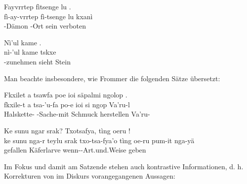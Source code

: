 \begin{interlin}
	\glll Fayvrrtep fìtsenge lu . \\
	fì-ay-vrrtep fì-tsenge lu kxanì \\
	-Dämon -Ort sein verboten \\
\end{interlin}

\begin{interlin}
	\glll Nì'ul kame . \\
	nì-'ul kame tskxe \\
	-zunehmen sieht Stein \\
\end{interlin}

\pagebreak

\noindent Man beachte insbesondere, wie Frommer die folgenden Sätze übersetzt:

\begin{interlin}
	\glll \Npawl{}Fkxilet a tsawfa poe ioi säpalmi ngolop . \\
	fkxile-t a tsa-'u-fa po-e ioi si ngop Va'ru-l \\
	Halskette-  -Sache-mit  Schmuck  herstellen Va'ru- \\
\end{interlin}

\begin{interlin}
	\glll Ke sunu ngar  srak? Txotsafya, tìng oeru  ! \\
	ke sunu nga-r teylu srak txo-tsa-fya'o tìng oe-ru pum-it nga-yä \\
	 gefallen  Käferlarve  wenn--Art.und.Weise geben    \\
\end{interlin}

\noindent Im Fokus und damit am Satzende stehen auch kontrastive Informationen, d. h. Korrekturen von im Diskurs vorangegangenen Aussagen:

